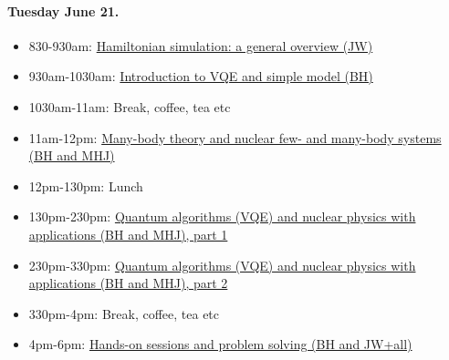 \documentclass[%
oneside,                 %
final,                   %
10pt]{article}
\begin{document}
\paragraph{Tuesday June 21.}
\begin{itemize}
\item 830-930am: \href{{https://nuclearphysicsworkshops.github.io/FRIB-TASummerSchoolQuantumComputing/doc/web/course.html}}{Hamiltonian simulation: a general overview (JW)}

\item 930am-1030am: \href{{https://nuclearphysicsworkshops.github.io/FRIB-TASummerSchoolQuantumComputing/doc/web/course.html}}{Introduction to VQE and simple model (BH)} 

\item 1030am-11am: Break, coffee, tea etc

\item 11am-12pm: \href{{https://nuclearphysicsworkshops.github.io/FRIB-TASummerSchoolQuantumComputing/doc/web/course.html}}{Many-body theory and nuclear few- and many-body systems (BH and MHJ)}

\item 12pm-130pm: Lunch

\item 130pm-230pm:  \href{{https://nuclearphysicsworkshops.github.io/FRIB-TASummerSchoolQuantumComputing/doc/web/course.html}}{Quantum algorithms (VQE) and nuclear physics with applications (BH and MHJ), part 1}

\item 230pm-330pm:  \href{{https://nuclearphysicsworkshops.github.io/FRIB-TASummerSchoolQuantumComputing/doc/web/course.html}}{Quantum algorithms (VQE) and nuclear physics with applications (BH and MHJ), part 2}

\item 330pm-4pm: Break, coffee, tea etc

\item 4pm-6pm: \href{{https://nuclearphysicsworkshops.github.io/FRIB-TASummerSchoolQuantumComputing/doc/web/course.html}}{Hands-on sessions and problem solving (BH and JW+all)}
\end{itemize}

\noindent
\end{document}
